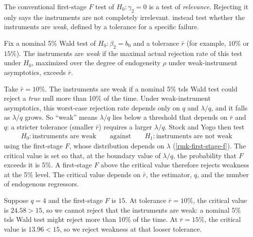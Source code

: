 \documentclass[a4paper,12pt]{article}
\begin{document}
The conventional first-stage $F$ test of $H_0:\gamma_2=0$ is a test of \emph{relevance}.
Rejecting it only says the instruments are not completely irrelevant.
\textcite{stock-yogo-2005} instead test whether the instruments are \emph{weak}, defined by a tolerance for a specific failure.

\begin{definition}
	Fix a nominal 5\% Wald test of $H_0:\beta_2=b_0$ and a tolerance $\bar r$ (for example, $10\%$ or $15\%$).
	The instruments are \emph{weak} if the maximal actual rejection rate of this test under $H_0$,
	maximized over the degree of endogeneity $\rho$ under weak-instrument asymptotics, exceeds $\bar r$.
\end{definition}

\begin{remark}
	Take $\bar r=10\%$.
	The instruments are weak if a nominal 5\% \gls{tsls} Wald test could reject a \emph{true} null more than 10\% of the time.
	Under weak-instrument asymptotics, this worst-case rejection rate depends only on $q$ and $\lambda/q$,
	and it falls as $\lambda/q$ grows.
	So ``weak'' means $\lambda/q$ lies below a threshold that depends on $\bar r$ and $q$:
	a stricter tolerance (smaller $\bar r$) requires a larger $\lambda/q$.
	Stock and Yogo then test
	\begin{align*}
		H_0:\text{instruments are weak}
		\qquad\text{against}\qquad
		H_1:\text{instruments are not weak}
	\end{align*}
	using the first-stage $F$, whose distribution depends on $\lambda$ (\autoref{rmk-first-stage-f}).
	The critical value is set so that, at the boundary value of $\lambda/q$, the probability that $F$ exceeds it is 5\%.
	A first-stage $F$ above the critical value therefore rejects weakness at the 5\% level.
	The critical value depends on $\bar r$, the estimator, $q$, and the number of endogenous regressors.
\end{remark}

\begin{example}
	Suppose $q=4$ and the first-stage $F$ is $15$.
	At tolerance $\bar r=10\%$, the critical value is $24.58>15$, so we cannot reject that the instruments are weak:
	a nominal 5\% \gls{tsls} Wald test might reject more than 10\% of the time.
	At $\bar r=15\%$, the critical value is $13.96<15$, so we reject weakness at that looser tolerance.
\end{example}
\end{document}
